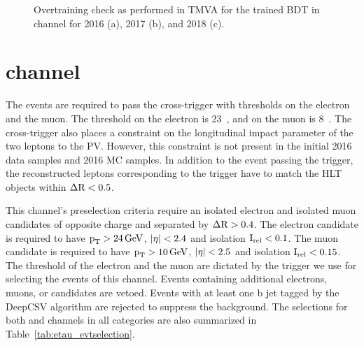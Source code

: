 \begin{figure}[htbp]
  \centering
  \caption{Overtraining check as performed in TMVA for the trained BDT in \ehad channel for 2016 (a), 2017 (b), and 2018 (c).}
  \label{fig:etauh_bdttrain}
\end{figure}



\section{\texorpdfstring{\Hemu}{Hetaumu} channel}
The events are required to pass the cross-trigger with \pt thresholds on the electron and the muon. The \pt threshold on the electron is 23~\GeV, and on the muon is 8~\GeV. The cross-trigger also places a constraint on the longitudinal impact parameter of the two leptons to the PV. However, this constraint is not present in the initial 2016 data samples and 2016 MC samples. In addition to the event passing the trigger, the reconstructed leptons corresponding to the trigger have to match the HLT objects within $\Delta \text{R} < 0.5$.

This channel's preselection criteria require an isolated electron and isolated muon candidates of opposite charge and separated by $\Delta \text{R} > 0.4$. The electron candidate is required to have $\text{p}_\text{T} > 24 \,\text{Ge\hspace{-.08em}V}$, $\lvert\eta\rvert < 2.4$ and isolation $\text{I}_\text{rel} < 0.1$. The muon candidate is required to have $\text{p}_\text{T} > 10 \,\text{Ge\hspace{-.08em}V}$, $\lvert\eta\rvert < 2.5$ and isolation $\text{I}_\text{rel} < 0.15$. The \pt threshold of the electron and the muon are dictated by the trigger we use for selecting the events of this channel. Events containing additional electrons, muons, or \tauh candidates are vetoed. Events with at least one b jet tagged by the DeepCSV algorithm are rejected to suppress the \ttbar background. The selections for both \ehad and \emu channels in all categories are also summarized in Table~\ref{tab:etau_evtselection}.

